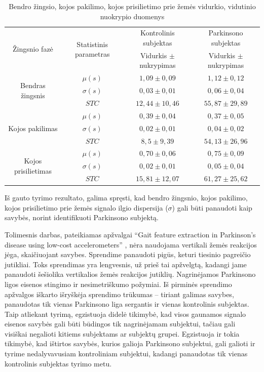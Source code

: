 \documentclass[]{vgtuef}
\begin{document}
\begin{table}
  \centering
  \caption{Bendro žingsio, kojos pakilimo, kojos prisilietimo prie žemės vidurkio, vidutinio nuokrypio duomenys \cite{5280353}}
  \label{table:gait_corr_params}
  \renewcommand{\arraystretch}{1.3}
	\begin{tabular}{|c|c|c|c|} \hline
		 \multirow{2}{*}{Žingsnio fazė} & 
		 \multirow{2}{*}{Statistinis parametras} & Kontrolinis subjektas & Parkinsono subjektas \\ 	\cline{3-4}
		 & & Vidurkis $\pm$ nukrypimas & Vidurkis $\pm$ nukrypimas \\ \hline
		 \multirow{3}{*}{Bendras žingsnis} 
		 	& $\mu(s)$    & $1,09 \pm 0,09$   & $1,12 \pm 0,12$ \\ \cline{2-4}
		 	& $\sigma(s)$ & $0,03 \pm 0,01$   & $0,06 \pm 0,04$ \\ \cline{2-4} 
		 	& $STC$       & $12,44 \pm 10,46$ & $55,87 \pm 29,89$ \\ \hline
		 \multirow{3}{*}{Kojos pakilimas}
	 	 	& $\mu(s)$    & $0,39 \pm 0,04$   & $0,37 \pm 0,05$ \\ \cline{2-4}
		 	& $\sigma(s)$ & $0,02 \pm 0,01$   & $0,04 \pm 0,02$ \\ \cline{2-4} 
		 	& $STC$       & $8,5 \pm 9,39$    & $54,13 \pm 26,96$ \\ \hline
		 \multirow{3}{*}{Kojos prisilietimas}
		 	& $\mu(s)$    & $0,70 \pm 0,06$   & $0,75 \pm 0,09$ \\ \cline{2-4}
		 	& $\sigma(s)$ & $0,02 \pm 0,01$   & $0,05 \pm 0,04$ \\ \cline{2-4} 
		 	& $STC$       & $15,81 \pm 12,07$ & $61,27 \pm 25,62$ \\ \hline
	\end{tabular}
\end{table}

Iš gauto tyrimo rezultato, galima spręsti, kad bendro žingsnio, kojos pakilimo, kojos prisilietimo prie žemės signalo ilgio dispersija ($\sigma$) gali būti panaudoti kaip savybės, norint identifikuoti Parkinsono subjektą.


Tolimesnis darbas, pateikiamas apžvalgai ``Gait feature extraction in Parkinson's disease using low-cost accelerometers'' \cite{6091948}, nėra naudojama vertikali žemės reakcijos jėga, skaičiuojant savybes. Sprendime panaudoti pigūs, keturi tiesinio pagreičio jutikliai. Toks sprendimas yra lengvesnis, už prieš tai apžvelgtą, kadangi jame panaudoti šešiolika vertikalios žemės reakcijos jutiklių. Nagrinėjamos Parkinsono ligos eisenos stingimo ir nesimetriškumo požymiai. Iš pirminės sprendimo apžvalgos iškarto išryškėja sprendimo trūkumas -- tiriant galimas savybes, panaudotas tik vienas Parkinsono liga sergantis ir vienas kontrolinis subjektas. Taip atliekant tyrimą, egzistuoja didelė tikimybė, kad visos gaunamos signalo eisenos savybės gali būti būdingos tik nagrinėjamam subjektui, tačiau gali visiškai negalioti kitiems subjektams ar subjektų grupei. Egzistuoja ir tokia tikimybė, kad ištirtos savybės, kurios galioja Parkinsono subjektui, gali galioti ir tyrime nedalyvavusiam kontroliniam subjektui, kadangi panaudotas tik vienas kontrolinis subjektas tyrimo metu.
\end{document}
